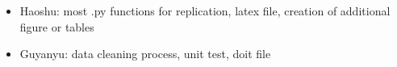\documentclass{article}
\begin{document}
\begin{itemize}
    \item Haoshu: most .py functions for replication, latex file, creation of additional figure or tables
    \item Guyanyu: data cleaning process, unit test, doit file
\end{itemize}












\clearpage






\end{document}
